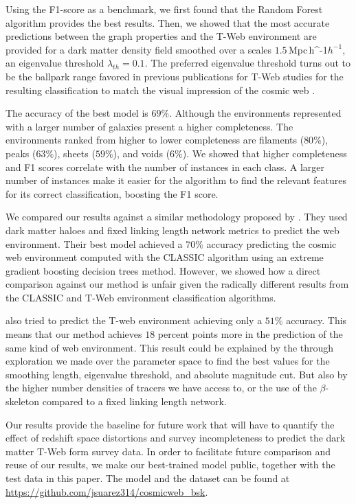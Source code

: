 \documentclass[usenatbib]{mnras}
\newcommand{\Mpch}{\,{\rm Mpc}\,\ifmmode h^{-1}\else $h^{-1}$\fi}
\begin{document}
Using the F1-score as a benchmark, we first found that the Random Forest algorithm provides the best results. Then, we showed that the most accurate predictions between the graph properties and the T-Web environment are provided for a dark matter density field smoothed over a scales $1.5$\Mpch, an eigenvalue threshold $\lambda_{th}=0.1$.
The preferred eigenvalue threshold turns out to be the ballpark range favored in previous publications for T-Web studies for the resulting classification to match the visual impression of the cosmic web \citep{Forero-Romero2009}.

The accuracy of the best model is $69\%$. Although the environments represented with a larger number of galaxies present a higher completeness. 
The environments ranked from higher to lower completeness are filaments ($80\%$), peaks ($63\%$), sheets ($59\%$), and voids ($6\%$).
We showed that higher completeness and F1 scores correlate with the number of instances in each class. 
A larger number of instances make it easier for the algorithm to find the relevant features for its correct classification, boosting the F1 score.

We compared our results against a similar methodology proposed by \cite{Tsizh2019}. 
They used dark matter haloes and fixed linking length network metrics to predict the web environment.
Their best model achieved a $70\%$ accuracy predicting the cosmic web environment computed with the CLASSIC algorithm using an extreme gradient boosting decision trees method. 
However, we showed how a direct comparison against our method is unfair given the radically different results from the CLASSIC and T-Web environment classification algorithms.

\cite{Tsizh2019} also tried to predict the T-web environment achieving only a $51\%$ accuracy.
This means that our method achieves $18$ percent points more 
in the prediction of the same kind of web environment.
This result could be explained by the through exploration we made over the parameter space to find the best values for
the smoothing length, eigenvalue threshold, and absolute magnitude cut.
But also  by the higher number densities of tracers we have access to, or the use of the $\beta$-skeleton compared to a fixed linking length network.

Our results provide the baseline for future work that will have to quantify the effect of redshift space distortions and survey incompleteness to predict the dark matter T-Web form survey data.
In order to facilitate future comparison and reuse of our results, we make our best-trained model public, together with the test data in this paper.
The model and the dataset can be found at \url{https://github.com/jsuarez314/cosmicweb_bsk}.
\end{document}
